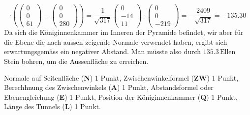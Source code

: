 \begin{loesung}
\begin{teilaufgaben}
\[\cdot
\left(
\begin{pmatrix}0\\0\\61\end{pmatrix}
-
\begin{pmatrix}0\\0\\280\end{pmatrix}
\right)
=
\frac1{\sqrt{317}}
\begin{pmatrix}0\\-14\\11 \end{pmatrix}
\cdot
\begin{pmatrix}0\\0\\-219\end{pmatrix}
=
-\frac{2409}{\sqrt{317}}=-135.30
\]
Da sich die Königinnenkammer im Inneren der Pyramide befindet, wir aber
für die Ebene die nach aussen zeigende Normale verwendet haben, ergibt
sich erwartungsgemäss ein negativer Abstand.
Man müsste also durch $135.3\,\text{Ellen}$ Stein bohren, um die Aussenfläche
zu erreichen.
\qedhere
\end{teilaufgaben}
\end{loesung}

\begin{bewertung}
Normale auf Seitenfläche ({\bf N}) 1 Punkt,
Zwischenwinkelformel ({\bf ZW}) 1 Punkt,
Berechhnung des Zwischenwinkels ({\bf A}) 1 Punkt,
Abstandsformel oder Ebenengleichung ({\bf E}) 1 Punkt,
Position der Königinnenkammer ({\bf Q}) 1 Punkt,
Länge des Tunnels ({\bf L}) 1 Punkt.
\end{bewertung}

